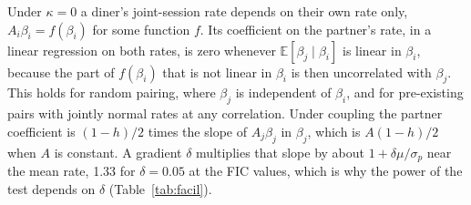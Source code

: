 \documentclass[12pt]{article}
\theoremstyle{definition}
\begin{document}
Under $\kappa=0$ a diner's joint-session rate depends on their own rate only,
$A_i\beta_i=f(\beta_i)$ for some function $f$. Its coefficient on the partner's rate,
in a linear regression on both rates, is zero whenever $\mathbb{E}[\beta_j\mid\beta_i]$
is linear in $\beta_i$, because the part of $f(\beta_i)$ that is not linear in
$\beta_i$ is then uncorrelated with $\beta_j$. This holds for random pairing, where
$\beta_j$ is independent of $\beta_i$, and for pre-existing pairs with jointly
normal rates at any correlation. Under coupling the partner coefficient is
$(1-h)/2$ times the slope of $A_j\beta_j$ in $\beta_j$, which is $A(1-h)/2$ when $A$
is constant. A gradient $\delta$ multiplies that slope by about
$1+\delta\mu/\sigma_p$ near the mean rate, 1.33 for $\delta=0.05$ at the FIC
values, which is why the power of the test depends on $\delta$
(Table~\ref{tab:facil}).
\end{document}

